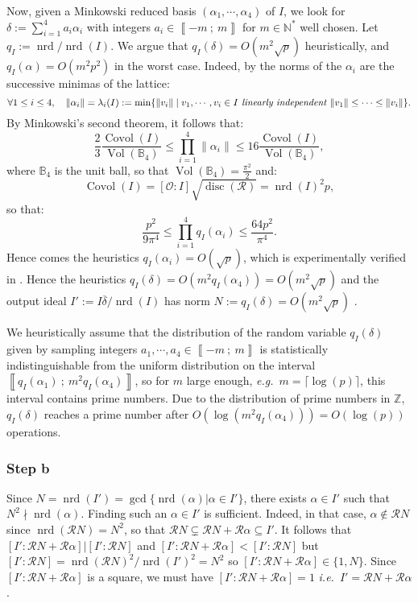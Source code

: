 \documentclass[a4paper,10pt,notitlepage]{report}
\theoremstyle{definition}
\theoremstyle{plain}
\theoremstyle{definition}
\newcommand{\ie}{\emph{i.e.}\ }
\newcommand{\eg}{\emph{e.g.}\ }
\newcommand{\N}{\mathbb{N}}
\newcommand{\Z}{\mathbb{Z}}
\newcommand{\B}{\mathbb{B}}
\newcommand{\m}[1]{\mathcal{#1}}
\newcommand{\mO}{\mathcal{O}}
\renewcommand{\i}[2]{\left\llbracket #1~;~#2\right\rrbracket}
\renewcommand{\(}{\left(}
\renewcommand{\)}{\right)}
\DeclareMathOperator{\disc}{disc}
\DeclareMathOperator{\nrd}{nrd}
\DeclareMathOperator{\Vol}{Vol}
\DeclareMathOperator{\Covol}{Covol}
\begin{document}
Now, given a Minkowski reduced basis $(\alpha_1, \cdots, \alpha_4)$ of $I$, we look for $\delta:=\sum_{i=1}^4 a_i\alpha_i$ with integers $a_i\in\i{-m}{m}$ for $m\in\N^*$ well chosen.  Let $q_I:=\nrd/\nrd(I)$. We argue that $q_I(\delta)=O(m^2\sqrt{p})$ heuristically, and $q_I(\alpha)=O(m^2p^2)$ in the worst case.  Indeed, by \cite[Teil I.  § 7]{VDW}
the norms of the $\alpha_i$ are the successive minimas of the lattice:
\[\forall 1\leq i\leq 4, \quad \|\alpha_i\|=\lambda_i(I):=\min\{\|v_i\|\mid v_1, \cdots, v_i\in I \emph{ linearly independent } \|v_1\|\leq\cdots\leq\|v_i\|\}.\]
By Minkowski's second theorem, it follows that:
\[\frac{2}{3}\frac{\Covol(I)}{\Vol(\B_4)}\leq \prod_{i=1}^4\|\alpha_i\|\leq 16\frac{\Covol(I)}{\Vol(\B_4)},\]
where $\B_4$ is the unit ball, so that $\Vol(\B_4)=\frac{\pi^2}{2}$ and:
\[\Covol(I)=[\mO:I]\sqrt{\disc(\m{R})}=\nrd(I)^2p,\]
so that:
\[\frac{p^2}{9\pi^4}\leq \prod_{i=1}^4q_I(\alpha_i)\leq \frac{64p^2}{\pi^4}.\]
Hence comes the heuristics $q_I(\alpha_i)=O(\sqrt{p})$, which is experimentally verified in \cite{KLPT}. Hence the heuristics $q_I(\delta)=O(m^2q_I(\alpha_4))=O(m^2\sqrt{p})$ and the output ideal $I':=I\overline{\delta}/\nrd(I)$ has norm $N:=q_I(\delta)=O(m^2\sqrt{p})$ .


We heuristically assume that the distribution of the random variable $q_I(\delta)$ given by sampling integers $a_1,\cdots,a_4\in\i{-m}{m}$ is statistically indistinguishable from the uniform distribution on the interval $\i{q_I(\alpha_1)}{m^2 q_I(\alpha_4)}$, so for $m$ large enough, \eg $m=\lceil \log(p)\rceil$, this interval contains prime numbers. Due to the distribution of prime numbers in $\Z$, $q_I(\delta)$ reaches a prime number after $O(\log(m^2 q_I(\alpha_4)))=O(\log(p))$ operations. 

\subsubsection{Step b}

Since $N=\nrd(I')=\gcd\{\nrd(\alpha)|\alpha\in I'\}$, there exists $\alpha\in I'$ such that $N^2\nmid\nrd(\alpha)$. Finding such an $\alpha\in I'$ is sufficient. Indeed, in that case, $\alpha\not\in \m{R}N$ since $\nrd(\m{R}N)=N^2$, so that $\m{R}N\subsetneq \m{R}N+\m{R}\alpha\subseteq I'$. It follows that $[I':\m{R}N+\m{R}\alpha]|[I':\m{R}N]$ and $[I':\m{R}N+\m{R}\alpha]<[I':\m{R}N]$ but $[I':\m{R}N]=\nrd(\m{R}N)^2/\nrd(I')^2=N^2$ so $[I':\m{R}N+\m{R}\alpha]\in \{1,N\}$. Since $[I':\m{R}N+\m{R}\alpha]$ is a square, we must have $[I':\m{R}N+\m{R}\alpha]=1$ \ie $I'=\m{R}N+\m{R}\alpha$.
\end{document}
